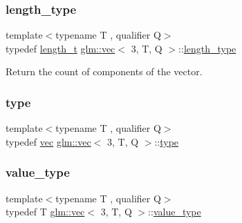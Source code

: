 \mbox{\label{structglm_1_1vec_3_013_00_01_t_00_01_q_01_4_ab586a87f82719bfdd180336a98843257}} 
\subsubsection{\texorpdfstring{length\+\_\+type}{length\_type}}
{\footnotesize\ttfamily template$<$typename T , qualifier Q$>$ \\
typedef \hyperlink{namespaceglm_a090a0de2260835bee80e71a702492ed9}{length\+\_\+t} \hyperlink{structglm_1_1vec}{glm\+::vec}$<$ 3, T, Q $>$\+::\hyperlink{structglm_1_1vec_3_013_00_01_t_00_01_q_01_4_ab586a87f82719bfdd180336a98843257}{length\+\_\+type}}



Return the count of components of the vector. 

\mbox{\label{structglm_1_1vec_3_013_00_01_t_00_01_q_01_4_aab5e53af2d54d8353fecdd9071c14560}} 
\subsubsection{\texorpdfstring{type}{type}}
{\footnotesize\ttfamily template$<$typename T , qualifier Q$>$ \\
typedef \hyperlink{structglm_1_1vec}{vec} \hyperlink{structglm_1_1vec}{glm\+::vec}$<$ 3, T, Q $>$\+::\hyperlink{structglm_1_1vec_3_013_00_01_t_00_01_q_01_4_aab5e53af2d54d8353fecdd9071c14560}{type}}

\mbox{\label{structglm_1_1vec_3_013_00_01_t_00_01_q_01_4_ac9d049f83235863ada16f91e67d28e3f}} 
\subsubsection{\texorpdfstring{value\+\_\+type}{value\_type}}
{\footnotesize\ttfamily template$<$typename T , qualifier Q$>$ \\
typedef T \hyperlink{structglm_1_1vec}{glm\+::vec}$<$ 3, T, Q $>$\+::\hyperlink{structglm_1_1vec_3_013_00_01_t_00_01_q_01_4_ac9d049f83235863ada16f91e67d28e3f}{value\+\_\+type}}



